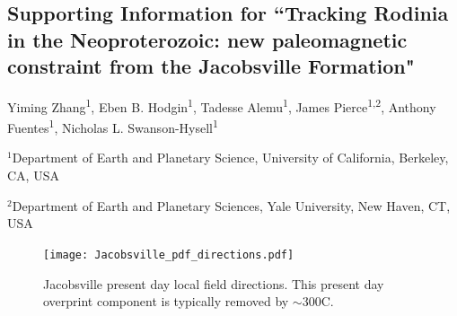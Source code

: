 \documentclass[11pt,letterpaper]{article}
\begin{document}
\renewcommand{\thefigure}{S\arabic{figure}}
\renewcommand{\thetable}{S\arabic{table}}
\subsection*{Supporting Information for ``Tracking Rodinia in the Neoproterozoic: new paleomagnetic constraint from the Jacobsville Formation"}
Yiming Zhang\textsuperscript{1}, Eben B. Hodgin\textsuperscript{1}, Tadesse Alemu\textsuperscript{1}, James Pierce\textsuperscript{1,2}, Anthony Fuentes\textsuperscript{1}, Nicholas L. Swanson-Hysell\textsuperscript{1}

{\small $^{1}$Department of Earth and Planetary Science, University of California, Berkeley, CA, USA


$^{2}$Department of Earth and Planetary Sciences, Yale University, New Haven, CT, USA}

\listoffigures
\listoftables
\tableofcontents


\begin{figure}[h!]
\centering
\texttt{[image: Jacobsville\_pdf\_directions.pdf]}
\caption{Jacobsville present day local field directions. This present day overprint component is typically removed by $\sim$300\textdegree C.}
\label{fig:Jacobsville_pdf}
\end{figure}
\end{document}
